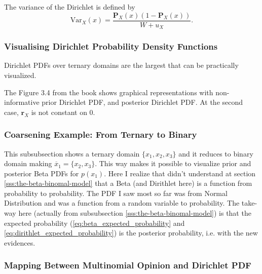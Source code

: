 The variance of the Dirichlet is defined by
\begin{equation}
    \mathrm{Var}_X(x) = \dfrac{\mathbf{P}_X(x)(1 - \mathbf{P}_X(x))}{W + u_X}\text{.}
\end{equation}

\subsubsection{Visualising Dirichlet Probability Density Functions}

Dirichlet PDFs over ternary domains are the largest that can be practically visualized.

The Figure 3.4 from the book shows graphical representations with non-informative prior Dirichlet PDF, and posterior Dirichlet PDF. At the second case, $\mathbf{r}_X$ is not constant on $0$.

\subsubsection{Coarsening Example: From Ternary to Binary}

This subsubsection shows a ternary domain $\{x_1, x_2, x_3\}$ and it reduces to binary domain making $\overline{x}_1 = \{x_2, x_3\}$. This way makes it possible to visualize prior and posterior Beta PDFs for $p(x_1)$. Here I realize that didn't understand at section \ref{sss:the-beta-binomal-model} that a Beta (and Dirithlet here) is a function from probability to probability. The PDF I saw most so far was from Normal Distribution and was a function from a random variable to probability. The take-way here (actually from subsubsection \ref{sss:the-beta-binomal-model}) is that the expected probability (\ref{eq:beta_expected_probability} and \ref{eq:dirithlet_expected_probability}) is the posterior probability, i.e. with the new evidences.

\subsubsection{Mapping Between Multinomial Opinion and Dirichlet PDF}

